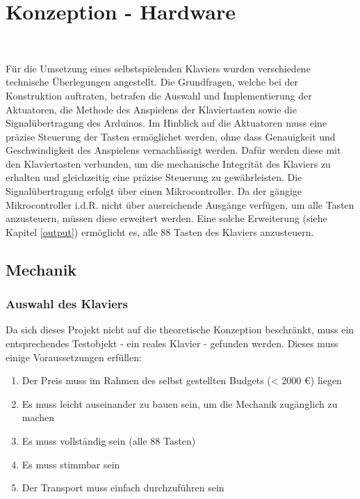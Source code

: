 
\graphicspath{ {./img/} }

\chapter{Konzeption - Hardware}\label{Hardware - Konzeption}~\nocite{*}

Für die Umsetzung eines selbstspielenden Klaviers wurden verschiedene technische Überlegungen angestellt.
Die Grundfragen, welche bei der Konstruktion auftraten, betrafen die Auswahl und Implementierung der
Aktuatoren, die Methode des Anspielens der Klaviertasten sowie die Signalübertragung des Arduinos.
Im Hinblick auf die Aktuatoren muss eine präzise Steuerung der Tasten
ermöglichet werden, ohne dass Genauigkeit und Geschwindigkeit des Anspielens vernachlässigt werden.
\newline
Dafür werden diese mit den Klaviertasten verbunden, um die mechanische Integrität des Klaviers
zu erhalten und gleichzeitig eine präzise Steuerung zu gewährleisten.\newline
Die Signalübertragung erfolgt über einen Mikrocontroller.
Da der gängige Mikrocontroller i.d.R. nicht über ausreichende Ausgänge verfügen,
um alle Tasten anzusteuern, müssen diese erweitert werden.
Eine solche Erweiterung (siehe Kapitel \ref{output}) ermöglicht es, alle 88 Tasten des Klaviers anzusteuern.

\section{Mechanik}\label{vorgehenHW}

\subsection{Auswahl des Klaviers}

Da sich dieses Projekt nicht auf die theoretische Konzeption beschränkt, muss ein entsprechendes Testobjekt - ein reales Klavier - gefunden werden.
Dieses muss einige Voraussetzungen erfüllen:
\begin{enumerate}
	\item 	Der Preis muss im Rahmen des selbst gestellten Budgets (< 2000 €) liegen
	\item 	Es muss leicht auseinander zu bauen sein, um die Mechanik zugänglich zu machen
	\item 	Es muss vollständig sein (alle 88 Tasten)
	\item 	Es muss stimmbar sein
	\item 	Der Transport muss einfach durchzuführen sein
\end{enumerate}


